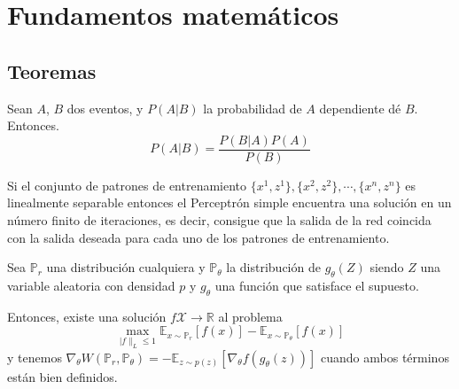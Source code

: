 \chapter*{Fundamentos matemáticos}

\section*{Teoremas}


\begin{theorem}[Bayes]
    Sean ${A}$, ${B}$ dos eventos, y ${P(A \vert B)}$ la probabilidad de ${A}$ dependiente dé ${B}$. Entonces.
    $$ P(A \vert B) = \frac{P\left( B \vert A \right) P\left(A\right)}{P\left(B\right)} $$
    
    \label{theorem:bayes}
\end{theorem}


\begin{theorem}
    Si el conjunto de patrones de entrenamiento $ \{x^{1}, z^{1}\}, \{x^{2}, z^{2}\}, \cdots, \{x^{n}, z^{n}\} $ es linealmente separable entonces el Perceptrón simple encuentra una solución en un número finito de iteraciones, es decir, consigue que la salida de la red coincida con la salida deseada para cada uno de los patrones de entrenamiento.

    \label{theorem:ConvergenciaRosenblatt}
\end{theorem}


\begin{theorem}[Wasserstein]

    Sea ${\mathbb{P}_{r}}$ una distribución cualquiera y ${\mathbb{P}_\theta}$ la distribución de ${g_\theta(Z)}$ siendo ${Z}$ una variable aleatoria con densidad ${p}$ y ${g_\theta}$ una función que satisface el supuesto.
    
    Entonces, existe una solución ${f \mathcal{X} \rightarrow \mathbb{R}}$ al problema 
    $$ \max_{|f\|_L \leq 1} \mathbb{E}_{x \sim \mathbb{P}_r}[f(x)] - \mathbb{E}_{x \sim \mathbb{P}_\theta} [f(x)] $$ y tenemos $ \nabla_\theta W(\mathbb{P}_r, \mathbb{P}_\theta) = -\mathbb{E}_{z \sim p(z)}[\nabla_\theta f(g_\theta(z))] $ cuando ambos términos están bien definidos.
    \label{theorem::gradW}
\end{theorem}

